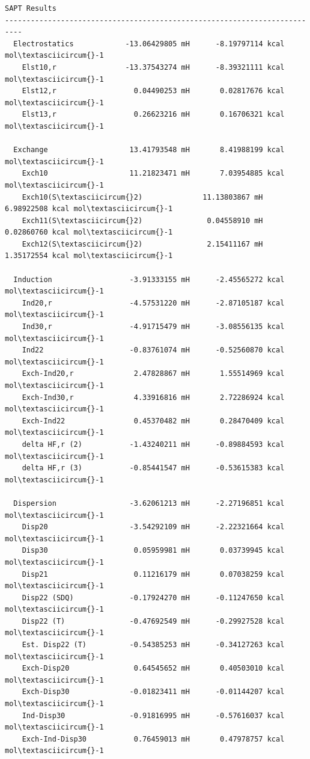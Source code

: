 \documentclass[letterpaper,10pt,english]{sphinxmanual}
\begin{document}
\begin{Verbatim}[commandchars=\\\{\}]
  SAPT Results
--------------------------------------------------------------------------
  Electrostatics            -13.06429805 mH      -8.19797114 kcal mol\textasciicircum{}-1
    Elst10,r                -13.37543274 mH      -8.39321111 kcal mol\textasciicircum{}-1
    Elst12,r                  0.04490253 mH       0.02817676 kcal mol\textasciicircum{}-1
    Elst13,r                  0.26623216 mH       0.16706321 kcal mol\textasciicircum{}-1

  Exchange                   13.41793548 mH       8.41988199 kcal mol\textasciicircum{}-1
    Exch10                   11.21823471 mH       7.03954885 kcal mol\textasciicircum{}-1
    Exch10(S\textasciicircum{}2)              11.13803867 mH       6.98922508 kcal mol\textasciicircum{}-1
    Exch11(S\textasciicircum{}2)               0.04558910 mH       0.02860760 kcal mol\textasciicircum{}-1
    Exch12(S\textasciicircum{}2)               2.15411167 mH       1.35172554 kcal mol\textasciicircum{}-1

  Induction                  -3.91333155 mH      -2.45565272 kcal mol\textasciicircum{}-1
    Ind20,r                  -4.57531220 mH      -2.87105187 kcal mol\textasciicircum{}-1
    Ind30,r                  -4.91715479 mH      -3.08556135 kcal mol\textasciicircum{}-1
    Ind22                    -0.83761074 mH      -0.52560870 kcal mol\textasciicircum{}-1
    Exch-Ind20,r              2.47828867 mH       1.55514969 kcal mol\textasciicircum{}-1
    Exch-Ind30,r              4.33916816 mH       2.72286924 kcal mol\textasciicircum{}-1
    Exch-Ind22                0.45370482 mH       0.28470409 kcal mol\textasciicircum{}-1
    delta HF,r (2)           -1.43240211 mH      -0.89884593 kcal mol\textasciicircum{}-1
    delta HF,r (3)           -0.85441547 mH      -0.53615383 kcal mol\textasciicircum{}-1

  Dispersion                 -3.62061213 mH      -2.27196851 kcal mol\textasciicircum{}-1
    Disp20                   -3.54292109 mH      -2.22321664 kcal mol\textasciicircum{}-1
    Disp30                    0.05959981 mH       0.03739945 kcal mol\textasciicircum{}-1
    Disp21                    0.11216179 mH       0.07038259 kcal mol\textasciicircum{}-1
    Disp22 (SDQ)             -0.17924270 mH      -0.11247650 kcal mol\textasciicircum{}-1
    Disp22 (T)               -0.47692549 mH      -0.29927528 kcal mol\textasciicircum{}-1
    Est. Disp22 (T)          -0.54385253 mH      -0.34127263 kcal mol\textasciicircum{}-1
    Exch-Disp20               0.64545652 mH       0.40503010 kcal mol\textasciicircum{}-1
    Exch-Disp30              -0.01823411 mH      -0.01144207 kcal mol\textasciicircum{}-1
    Ind-Disp30               -0.91816995 mH      -0.57616037 kcal mol\textasciicircum{}-1
    Exch-Ind-Disp30           0.76459013 mH       0.47978757 kcal mol\textasciicircum{}-1


\end{Verbatim}
\end{document}
